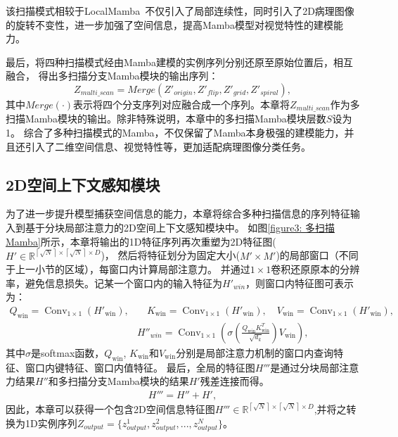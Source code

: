 该扫描模式相较于LocalMamba~\cite{huang2024localmamba}不仅引入了局部连续性，同时引入了2D病理图像的旋转不变性，进一步加强了空间信息，提高Mamba模型对视觉特性的建模能力。

最后，将四种扫描模式经由Mamba建模的实例序列分别还原至原始位置后，相互融合，
得出多扫描分支Mamba模块的输出序列：
\begin{equation}
  Z_{multi\_scan}=Merge(Z'_{origin}, Z'_{flip}, Z'_{grid}, Z'_{spiral}),
\end{equation}
其中$Merge(\cdot)$表示将四个分支序列对应融合成一个序列。本章将$Z_{multi\_scan}$作为多扫描Mamba模块的输出。除非特殊说明，本章中的多扫描Mamba模块层数$S$设为1。
综合了多种扫描模式的Mamba，不仅保留了Mamba本身极强的建模能力，并且还引入了二维空间信息、视觉特性等，更加适配病理图像分类任务。

\subsection[\hspace{-2pt}2D空间上下文感知模块]{{\heiti{} \hspace{-8pt}2D空间上下文感知模块}}\label{section3: 2D空间上下文感知模块}

为了进一步提升模型捕获空间信息的能力，本章将综合多种扫描信息的序列特征输入到基于分块局部注意力的2D空间上下文感知模块中。
如图\ref{figure3: 多扫描Mamba}所示，本章将输出的1D特征序列再次重塑为2D特征图($H'\in \mathbb{R} ^{\left\lceil\sqrt{N}\right\rceil\times\left\lceil\sqrt{N}\right\rceil\times D}$)，
然后将特征划分为固定大小($M' \times M'$)的局部窗口（不同于上一小节的区域），每窗口内计算局部注意力。
并通过$1 \times 1$卷积还原原本的分辨率，避免信息损失。记某一个窗口内的输入特征为$H'_{win}$，则窗口内特征图可表示为：
\begin{equation}
\begin{aligned}
  Q_{\mathrm{win}}=\operatorname{Conv}_{1 \times 1}\left(H'_{\mathrm{win}}\right),
  &\quad K_{\mathrm{win}}=\operatorname{Conv}_{1 \times 1}\left(H'_{\mathrm{win}}\right),
  \quad V_{\mathrm{win}}=\operatorname{Conv}_{1 \times 1}\left(H'_{\mathrm{win}}\right),\\
  &H''_{win}=\operatorname{Conv}_{1 \times 1}\left(\sigma\left(\frac{Q_{\mathrm{win}} K_{\mathrm{win}}^{T}}{\sqrt{d_{k}}}\right) V_{\mathrm{win}}\right) ,
\end{aligned}
\end{equation}
其中$\sigma$是softmax函数，$Q_{\mathrm{win}}$, $K_{\mathrm{win}}$和$V_{\mathrm{win}}$分别是局部注意力机制的窗口内查询特征、窗口内键特征、窗口内值特征。
最后，全局的特征图$H'''$是通过分块局部注意力结果$H''$和多扫描分支Mamba模块的结果$H'$残差连接而得。
\begin{equation}
  \begin{aligned}
    H'''= H''+ H',
  \end{aligned}
  \end{equation}
因此，本章可以获得一个包含2D空间信息特征图$H'''\in \mathbb{R} ^{\left\lceil\sqrt{N}\right\rceil\times\left\lceil\sqrt{N}\right\rceil\times D}$,并将之转换为1D实例序列$Z_{output}=\{z^1_{output},z^2_{output},...,z^N_{output}\}$。


